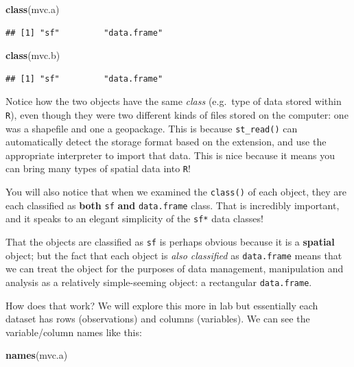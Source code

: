 \documentclass[
]{book}
\newenvironment{Shaded}{\begin{snugshade}}{\end{snugshade}}
\newcommand{\FunctionTok}[1]{\textcolor[rgb]{0.13,0.29,0.53}{\textbf{#1}}}
\newcommand{\NormalTok}[1]{#1}
\begin{document}
\begin{Shaded}
\begin{Highlighting}[]
\FunctionTok{class}\NormalTok{(mvc.a)}
\end{Highlighting}
\end{Shaded}

\begin{verbatim}
## [1] "sf"         "data.frame"
\end{verbatim}

\begin{Shaded}
\begin{Highlighting}[]
\FunctionTok{class}\NormalTok{(mvc.b)}
\end{Highlighting}
\end{Shaded}

\begin{verbatim}
## [1] "sf"         "data.frame"
\end{verbatim}

Notice how the two objects have the same \emph{class} (e.g.~type of data stored within \texttt{R}), even though they were two different kinds of files stored on the computer: one was a shapefile and one a geopackage. This is because \texttt{st\_read()} can automatically detect the storage format based on the extension, and use the appropriate interpreter to import that data. This is nice because it means you can bring many types of spatial data into \texttt{R}!

You will also notice that when we examined the \texttt{class()} of each object, they are each classified as \textbf{both} \texttt{sf} \textbf{and} \texttt{data.frame} class. That is incredibly important, and it speaks to an elegant simplicity of the \texttt{sf*} data classes!

That the objects are classified as \texttt{sf} is perhaps obvious because it is a \textbf{spatial} object; but the fact that each object is \emph{also classified} as \texttt{data.frame} means that we can treat the object for the purposes of data management, manipulation and analysis as a relatively simple-seeming object: a rectangular \texttt{data.frame}.

How does that work? We will explore this more in lab but essentially each dataset has rows (observations) and columns (variables). We can see the variable/column names like this:

\begin{Shaded}
\begin{Highlighting}[]
\FunctionTok{names}\NormalTok{(mvc.a)}
\end{Highlighting}
\end{Shaded}
\end{document}
